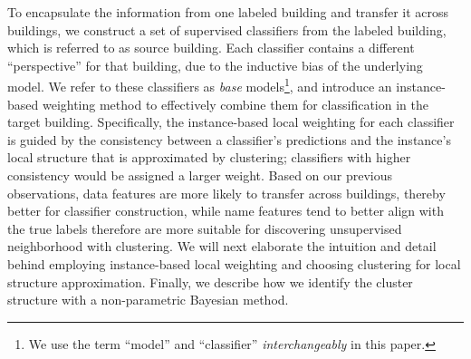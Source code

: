 To encapsulate the information from one labeled building and transfer it across buildings, we construct a set of supervised classifiers 
from the labeled building, which is referred to as source building.
Each classifier contains a different ``perspective'' for that building, due to the inductive bias of the underlying model.
We refer to these classifiers as {\it base} models\footnote{We use the term ``model'' and ``classifier'' {\it interchangeably} in this paper.}, and introduce an instance-based weighting method to effectively combine them for classification in the target building.
Specifically, the instance-based local weighting for each classifier is guided by the consistency between a classifier's predictions and the instance's local structure that is approximated by clustering; classifiers with higher consistency would be assigned a larger weight. 
Based on our previous observations, data features are more likely to transfer across buildings, thereby better for classifier construction, while name features tend to better align with the true labels therefore are more suitable for discovering unsupervised neighborhood with clustering.
We will next elaborate the intuition and detail behind employing instance-based local weighting and choosing clustering for local structure approximation.
Finally, we describe how we identify the cluster structure with a non-parametric Bayesian method.


